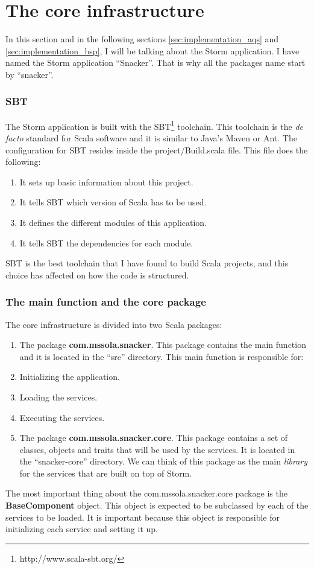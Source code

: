 
\section{The core infrastructure}
\label{sec:implementation_core}

In this section and in the following sections \ref{sec:implementation_aqs} and
\ref{sec:implementation_bsp}, I will be talking about the Storm application.
I have named the Storm application ``Snacker''. That is why all the packages
name start by ``snacker''.

\subsubsection*{SBT}

The Storm application is built with the SBT\footnote{http://www.scala-sbt.org/}
toolchain. This toolchain is the {\it de facto} standard for Scala software and
it is similar to Java's Maven or Ant. The configuration for SBT resides inside
the project/Build.scala file. This file does the following:

\begin{enumerate}
  \itemsep0em
  \item It sets up basic information about this project.
  \item It tells SBT which version of Scala has to be used.
  \item It defines the different modules of this application.
  \item It tells SBT the dependencies for each module.
\end{enumerate}

SBT is the best toolchain that I have found to build Scala projects, and this
choice has affected on how the code is structured.

\subsubsection*{The main function and the core package}

The core infrastructure is divided into two Scala packages:

\begin{enumerate}
  \itemsep0em
  \item The package {\bf com.mssola.snacker}. This package contains the main
function and it is located in the ``src'' directory. This main function is
responsible for:
    \mylist
      \item Initializing the application.
      \item Loading the services.
      \item Executing the services.
    \mylistend
  \item The package {\bf com.mssola.snacker.core}. This package contains a set
of classes, objects and traits that will be used by the services. It is
located in the ``snacker-core'' directory. We can think of this package as the
main {\it library} for the services that are built on top of Storm.
\end{enumerate}

The most important thing about the com.mssola.snacker.core package is the {\bf
BaseComponent} object. This object is expected to be subclassed by each of the
services to be loaded. It is important because this object is responsible for
initializing each service and setting it up.

